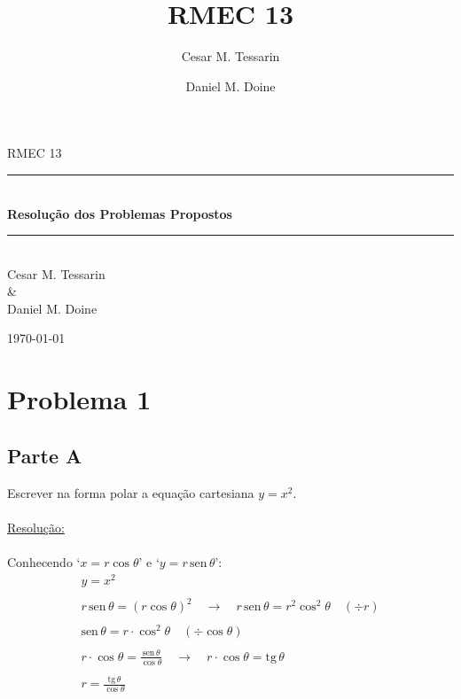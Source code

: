 \documentclass[a4paper,12pt,final]{article}
\title{RMEC 13}
\author{Cesar M. Tessarin \and Daniel M. Doine}
\newcommand{\HRule}{\rule{\linewidth}{0.5mm}}
\begin{document}
\begin{titlepage}
\begin{center}

\LARGE RMEC 13\\[1cm]

\HRule\\[0.5cm]
{\huge \bfseries Resolução dos Problemas Propostos}
\HRule
\\[8cm]
Cesar M. Tessarin\\
{\large \&}\\
Daniel M. Doine

\vfill

{\large \today}

\end{center}
\end{titlepage}

\section*{Problema 1}
\subsection*{Parte A}
Escrever na forma polar a equação cartesiana $y = x^2$.\\
\\
\underline{Resolução:}\\
\\
Conhecendo `$x = r\cos\theta$' e `$y = r\,\textrm{sen}\,\theta$':
\begin{gather*}
y = x^2\\\\
r\,\textrm{sen}\,\theta = (r\cos\theta)^2\quad\rightarrow\quad
r\,\textrm{sen}\,\theta = r^2\cos^2\theta\quad(\div r)\\\\
\textrm{sen}\,\theta = r\cdot\cos^2\theta\quad(\div \cos\theta)\\\\
r\cdot \cos\theta = \frac{\textrm{sen}\,\theta}{\cos\theta}\quad\rightarrow\quad
r\cdot\cos\theta = \textrm{tg}\,\theta\\\\
\boxed{r = \frac{\textrm{tg}\,\theta}{\cos\theta}}
\end{gather*}
\end{document}
